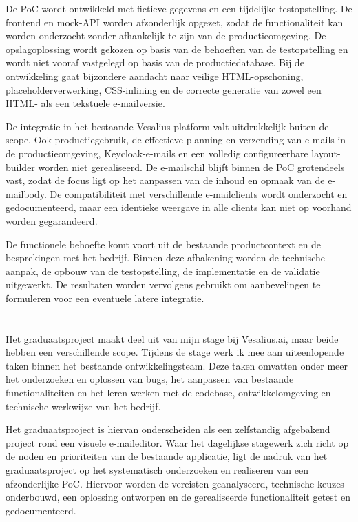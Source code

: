 De PoC wordt ontwikkeld met fictieve gegevens en een tijdelijke testopstelling.
De frontend en mock-API worden afzonderlijk opgezet, zodat de functionaliteit
kan worden onderzocht zonder afhankelijk te zijn van de productieomgeving.
De opslagoplossing wordt gekozen op basis van de behoeften van de testopstelling
en wordt niet vooraf vastgelegd op basis van de productiedatabase. Bij de
ontwikkeling gaat bijzondere aandacht naar veilige HTML-opschoning,
placeholderverwerking, CSS-inlining en de correcte generatie van zowel een
HTML- als een tekstuele e-mailversie.

De integratie in het bestaande Vesalius-platform valt uitdrukkelijk buiten
de scope. Ook productiegebruik, de effectieve planning en verzending van
e-mails in de productieomgeving, Keycloak-e-mails en een volledig
configureerbare layout-builder worden niet gerealiseerd. De e-mailschil blijft
binnen de PoC grotendeels vast, zodat de focus ligt op het aanpassen van de
inhoud en opmaak van de e-mailbody. De compatibiliteit met verschillende
e-mailclients wordt onderzocht en gedocumenteerd, maar een identieke weergave
in alle clients kan niet op voorhand worden gegarandeerd.

De functionele behoefte komt voort uit de bestaande productcontext en de
besprekingen met het bedrijf. Binnen deze afbakening worden de technische
aanpak, de opbouw van de testopstelling, de implementatie en de validatie
uitgewerkt. De resultaten worden vervolgens gebruikt om aanbevelingen te
formuleren voor een eventuele latere integratie.

\section{}%
\label{sec:stage-vs-project}
Het graduaatsproject maakt deel uit van mijn stage bij Vesalius.ai, maar beide
hebben een verschillende scope. Tijdens de stage werk ik mee aan uiteenlopende
taken binnen het bestaande ontwikkelingsteam. Deze taken omvatten onder meer
het onderzoeken en oplossen van bugs, het aanpassen van bestaande
functionaliteiten en het leren werken met de codebase, ontwikkelomgeving en
technische werkwijze van het bedrijf.

Het graduaatsproject is hiervan onderscheiden als een zelfstandig afgebakend
project rond een visuele e-maileditor. Waar het dagelijkse stagewerk zich richt
op de noden en prioriteiten van de bestaande applicatie, ligt de nadruk van
het graduaatsproject op het systematisch onderzoeken en realiseren van een
afzonderlijke PoC. Hiervoor worden de vereisten geanalyseerd, technische
keuzes onderbouwd, een oplossing ontworpen en de gerealiseerde functionaliteit
getest en gedocumenteerd.

